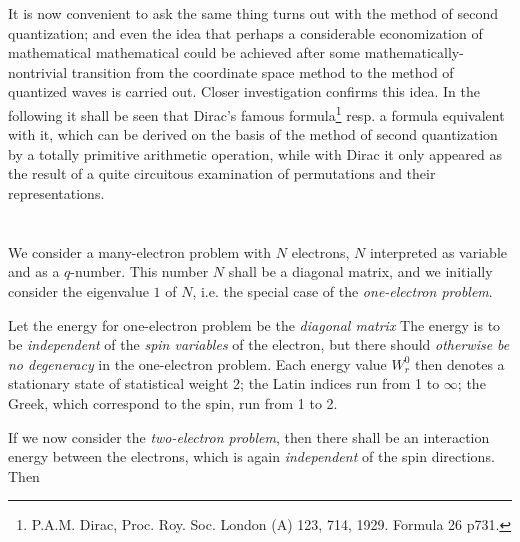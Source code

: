 \begin{paper}{1}
It is now convenient to ask the same thing turns out with the method of second quantization; and even the idea that perhaps a considerable economization of mathematical mathematical could be achieved after some mathematically-nontrivial transition from the coordinate space method to the method of quantized waves is carried out. Closer investigation confirms this idea. In the following it shall be seen that Dirac's famous formula\footnote{P.A.M. Dirac, Proc. Roy. Soc. London (A) 123, 714, 1929. Formula 26 p731.}
resp. a formula equivalent with it, which can be derived on the basis of the method of second quantization by a totally primitive arithmetic operation, while with Dirac it only appeared as the result of a quite circuitous examination of permutations and their representations.

\section{} We consider a many-electron problem with $N$ electrons, $N$ interpreted as variable and as a $q$-number. This number $N$ shall be a diagonal matrix, and we initially consider the eigenvalue $1$ of $N$, i.e. the special case of the \textit{one-electron problem}.

Let the energy for one-electron problem be the \textit{diagonal matrix}
The energy is to be \textit{independent} of the \textit{spin variables} of the electron, but there should \textit{otherwise be no degeneracy} in the one-electron problem. Each energy value $W_r^0$ then denotes a stationary state of statistical weight 2; the Latin indices run from 1 to $\infty$; the Greek, which correspond to the spin, run from 1 to 2.

If we now consider the \textit{two-electron problem}, then there shall be an interaction energy
between the electrons, which is again \textit{independent} of the spin directions. Then


\end{paper}
